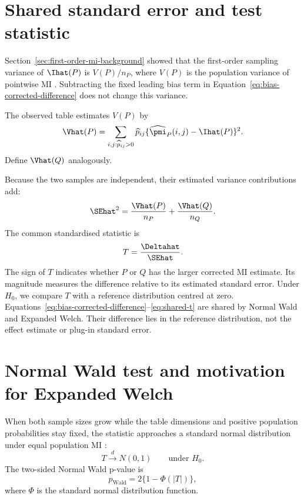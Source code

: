 \section{Shared standard error and test statistic}

Section~\ref{sec:first-order-mi-background} showed that the first-order
sampling variance of \(\Ihat(P)\) is \(V(P)/n_P\), where \(V(P)\) is the
population variance of pointwise MI \citep{moddemeijer1989,brillinger2004}.
Subtracting the fixed leading bias term
in Equation~\eqref{eq:bias-corrected-difference} does not change this
variance.

The observed table estimates \(V(P)\) by
\begin{equation}
  \Vhat(P)
  =\sum_{i,j:\widehat p_{ij}>0}
  \widehat p_{ij}
  \{\widehat\pmi_P(i,j)-\Ihat(P)\}^2.
  \label{eq:estimated-mi-variance}
\end{equation}
Define \(\Vhat(Q)\) analogously.

Because the two samples are independent, their estimated variance
contributions add:
\begin{equation}
  \SEhat^2
  =\frac{\Vhat(P)}{n_P}
  +\frac{\Vhat(Q)}{n_Q}.
  \label{eq:shared-se}
\end{equation}
The common standardised statistic is
\begin{equation}
  T=\frac{\Deltahat}{\SEhat}.
  \label{eq:shared-t}
\end{equation}
The sign of \(T\) indicates whether \(P\) or \(Q\) has the larger
corrected MI estimate. Its magnitude measures the difference relative to its estimated
standard error. Under \(H_0\), we compare \(T\) with a reference distribution
centred at zero.
Equations~\eqref{eq:bias-corrected-difference}--\eqref{eq:shared-t} are shared
by Normal Wald and Expanded Welch. Their difference lies in the reference
distribution, not the effect estimate or plug-in standard error.

\section{Normal Wald test and motivation for Expanded Welch}

When both sample sizes grow while the table dimensions and positive
population probabilities stay fixed, the statistic approaches a standard
normal distribution under equal population MI
\citep{wald1943,vanderVaart1998}:
\begin{equation}
  T\xrightarrow{d}N(0,1)
  \qquad\text{under }H_0.
\end{equation}
The two-sided Normal Wald p-value is
\begin{equation}
  p_{\mathrm{Wald}}
  =2\{1-\Phi(|T|)\},
  \label{eq:wald-pvalue}
\end{equation}
where \(\Phi\) is the standard normal distribution function.

